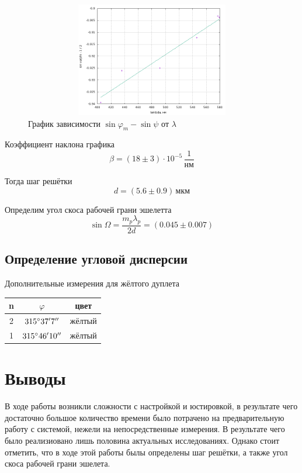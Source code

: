 \documentclass[12pt]{article}
\begin{document}
\begin{figure}[h!]
	\centering
	\includegraphics[width = 12cm, height = 5cm]{plot1.png}
	\caption{График зависимости $\sin \varphi_m - \sin \psi$ от $\lambda$}
\end{figure}
\par
	Коэффициент наклона графика
\[
	\beta = \left(18 \pm 3\right) \cdot 10^{-5} \, \frac{1}{\text{нм}}
\]
\par
	Тогда шаг решётки
\[
	d = \left(5.6 \pm 0.9 \right) \, \text{мкм}
\]
\par
	Определим угол скоса рабочей грани эшелетта
\[
	\sin \Omega = \frac{m_p \lambda_p}{2 d} = (0.045 \pm 0.007)
\]

\newpage
\subsection*{Определение угловой дисперсии}
\par
	Дополнительные измерения для жёлтого дуплета
\begin{table}[h!]
	\centering
	\begin{tabular}{|c|c|c|}
	\hline
		n & $\varphi$ & цвет \\
	\hline
		2 & $315 \degree 37' 7''$ & жёлтый \\
	\hline
		1 & $315 \degree 46' 10''$ & жёлтый \\
	\hline
	\end{tabular}
\end{table}

\section*{Выводы}
\par
	В ходе работы возникли сложности с настройкой и юстировкой, в результате чего достаточно большое количество времени было потрачено на предварительную работу с системой, нежели на непосредственные измерения. В результате чего было реализиовано лишь половина актуальных исследованиях. Однако стоит отметить, что в ходе этой работы былы определены шаг решётки, а также угол скоса рабочей грани эшелета.
\end{document}

